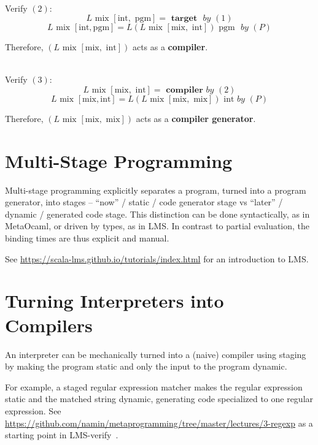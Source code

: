 \ \\

\noindent
Verify $(2)$:
$$L \text{ mix } [\text{int}, \text{ pgm}] = \textbf{ target } \textit{ by } (1)$$
$$L \text{ mix } [\text{int}, \text{pgm}] = L (L \text{ mix } [\text{mix}, \text{ int}]) \text{ pgm } \textit{ by } (P)$$
\begin{center}Therefore, $(L \text{ mix } [\text{mix}, \text{ int}])$ acts as a {\bf compiler}.\end{center}

\ \\

\noindent
Verify $(3)$:
$$L \text{ mix } [\text{mix}, \text{ int}] = \textbf{ compiler } \textit{by } (2)$$
$$L \text{ mix } [\text{mix}, \text{int}] = L (L \text{ mix } [\text{mix}, \text{ mix}]) \text{ int } \textit{by } (P)$$
\begin{center}Therefore, $(L \text{ mix } [\text{mix}, \text{ mix}])$ acts as a {\bf compiler generator}.\end{center}

\section{Multi-Stage Programming}

Multi-stage programming explicitly separates a program, turned into a
program generator, into stages -- ``now'' / static / code generator
stage vs ``later'' / dynamic / generated code stage. This distinction
can be done syntactically, as in MetaOcaml, or driven by types, as in
LMS. In contrast to partial evaluation, the binding times are thus
explicit and manual.

See \url{https://scala-lms.github.io/tutorials/index.html} for an introduction to LMS.

\section{Turning Interpreters into Compilers}

An interpreter can be mechanically turned into a (naive) compiler
using staging by making the program static and only the input to the
program dynamic.

For example, a staged regular expression matcher makes the regular
expression static and the matched string dynamic, generating code
specialized to one regular expression. See
\url{https://github.com/namin/metaprogramming/tree/master/lectures/3-regexp}
as a starting point in LMS-verify~\citep{lms-verify}.

